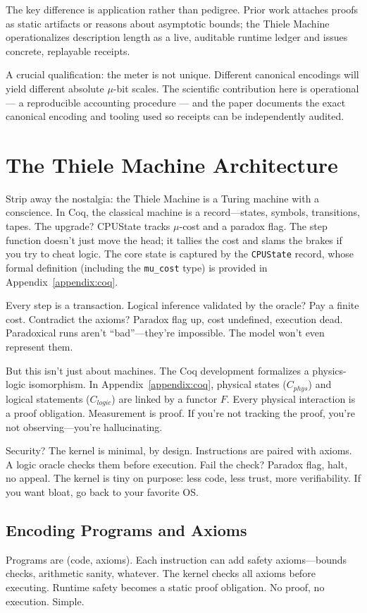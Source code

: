 \documentclass[11pt]{article}
\begin{document}
The key difference is application rather than pedigree. Prior work attaches proofs as static artifacts or reasons about asymptotic bounds; the Thiele Machine operationalizes description length as a live, auditable runtime ledger and issues concrete, replayable receipts.

A crucial qualification: the meter is not unique. Different canonical encodings will yield different absolute \(\mu\)-bit scales. The scientific contribution here is operational — a reproducible accounting procedure — and the paper documents the exact canonical encoding and tooling used so receipts can be independently audited.

\section{The Thiele Machine Architecture}
Strip away the nostalgia: the Thiele Machine is a Turing machine with a conscience. In Coq, the classical machine is a record---states, symbols, transitions, tapes. The upgrade? CPUState tracks $\mu$-cost and a paradox flag. The step function doesn’t just move the head; it tallies the cost and slams the brakes if you try to cheat logic. The core state is captured by the \texttt{CPUState} record, whose formal definition (including the \texttt{mu\_cost} type) is provided in Appendix~\ref{appendix:coq}.

Every step is a transaction. Logical inference validated by the oracle? Pay a finite cost. Contradict the axioms? Paradox flag up, cost undefined, execution dead. Paradoxical runs aren’t ``bad''---they’re impossible. The model won’t even represent them.

But this isn’t just about machines. The Coq development formalizes a physics-logic isomorphism. In Appendix~\ref{appendix:coq}, physical states ($C_{phys}$) and logical statements ($C_{logic}$) are linked by a functor $F$. Every physical interaction is a proof obligation. Measurement is proof. If you’re not tracking the proof, you’re not observing---you’re hallucinating.

Security? The kernel is minimal, by design. Instructions are paired with axioms. A logic oracle checks them before execution. Fail the check? Paradox flag, halt, no appeal. The kernel is tiny on purpose: less code, less trust, more verifiability. If you want bloat, go back to your favorite OS.

\subsection{Encoding Programs and Axioms}
Programs are (code, axioms). Each instruction can add safety axioms---bounds checks, arithmetic sanity, whatever. The kernel checks all axioms before executing. Runtime safety becomes a static proof obligation. No proof, no execution. Simple.
\end{document}
